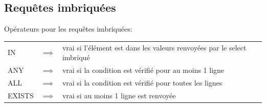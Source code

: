 \documentclass[a4paper]{article}
\begin{document}
\subsection{Requêtes imbriquées}





Opérateurs pour les requêtes imbriquées:
\begin{center}
     \begin{tabular}{lll}
        IN     & $ \implies $ & vrai si l'élément est dans les valeurs renvoyées par le select imbriqué \\
        ANY    & $ \implies $ & vrai si la condition est vérifié pour au moins 1 ligne \\
        ALL    & $ \implies $ & vrai si la condition est vérifié pour toutes les lignes \\
        EXISTS & $ \implies $ & vrai si au moins 1 ligne est renvoyée \\
     \end{tabular}
\end{center}
\end{document}
